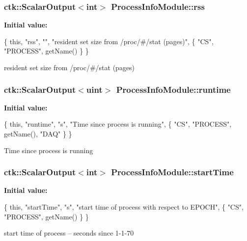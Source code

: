 \subsubsection[{\texorpdfstring{rss}{rss}}]{\setlength{\rightskip}{0pt plus 5cm}ctk\+::\+Scalar\+Output$<$int$>$ Process\+Info\+Module\+::rss}\hypertarget{structProcessInfoModule_aeabc4e2387c4facc7097dafb5a745bd4}{}\label{structProcessInfoModule_aeabc4e2387c4facc7097dafb5a745bd4}
{\bfseries Initial value\+:}
\begin{DoxyCode}
\{ \textcolor{keyword}{this}, \textcolor{stringliteral}{"rss"}, \textcolor{stringliteral}{""}, \textcolor{stringliteral}{"resident set size from /proc/#/stat (pages)"},
    \{ \textcolor{stringliteral}{"CS"}, \textcolor{stringliteral}{"PROCESS"}, getName() \} \}
\end{DoxyCode}
resident set size from /proc/\#/stat (pages) 
\subsubsection[{\texorpdfstring{runtime}{runtime}}]{\setlength{\rightskip}{0pt plus 5cm}ctk\+::\+Scalar\+Output$<$uint$>$ Process\+Info\+Module\+::runtime}\hypertarget{structProcessInfoModule_a8c11129c477f0177e253f3ce414d0fc3}{}\label{structProcessInfoModule_a8c11129c477f0177e253f3ce414d0fc3}
{\bfseries Initial value\+:}
\begin{DoxyCode}
\{ \textcolor{keyword}{this}, \textcolor{stringliteral}{"runtime"}, \textcolor{stringliteral}{"s"}, \textcolor{stringliteral}{"Time since process is running"},
    \{ \textcolor{stringliteral}{"CS"}, \textcolor{stringliteral}{"PROCESS"}, getName(), \textcolor{stringliteral}{"DAQ"} \} \}
\end{DoxyCode}
Time since process is running 
\subsubsection[{\texorpdfstring{start\+Time}{startTime}}]{\setlength{\rightskip}{0pt plus 5cm}ctk\+::\+Scalar\+Output$<$int$>$ Process\+Info\+Module\+::start\+Time}\hypertarget{structProcessInfoModule_aa52bd4fa074f2eae67418bf7f5eec591}{}\label{structProcessInfoModule_aa52bd4fa074f2eae67418bf7f5eec591}
{\bfseries Initial value\+:}
\begin{DoxyCode}
\{ \textcolor{keyword}{this}, \textcolor{stringliteral}{"startTime"}, \textcolor{stringliteral}{"s"}, \textcolor{stringliteral}{"start time of process with respect to EPOCH"},
    \{ \textcolor{stringliteral}{"CS"}, \textcolor{stringliteral}{"PROCESS"}, getName() \} \}
\end{DoxyCode}
start time of process -- seconds since 1-\/1-\/70 

